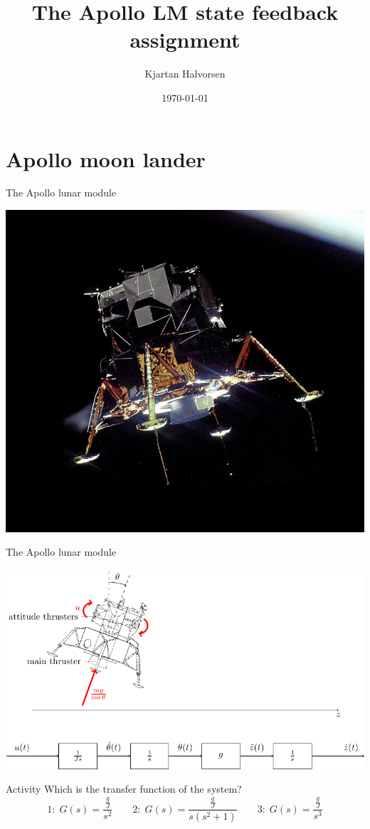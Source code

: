 \documentclass[presentation,aspectratio=169]{beamer}
\author{Kjartan Halvorsen}
\date{\today}
\title{The Apollo LM state feedback assignment}
\begin{document}
\maketitle



\section{Apollo moon lander}
\label{sec:org356e4e4}

\begin{frame}[label={sec:org4981e16}]{The Apollo lunar module}
\begin{center}
  \includegraphics[width=0.5\linewidth]{../../figures/Apollo_11_Lunar_Module.jpg}
\end{center}
\end{frame}

\begin{frame}[label={sec:org65c426a}]{The Apollo lunar module}
\begin{center}
\includegraphics[width=0.7\linewidth]{../../figures/fig-apollo}
\end{center}

\pause

\alert{Activity} Which is the transfer function of the system?
   \[1: \; G(s) = \frac{\frac{g}{J} }{s^2}\qquad 2: \; G(s) = \frac{\frac{g}{J} }{s(s^2 + 1)} \qquad 3: \; G(s) = \frac{\frac{g}{J} }{s^3}\]
\end{frame}
\end{document}
